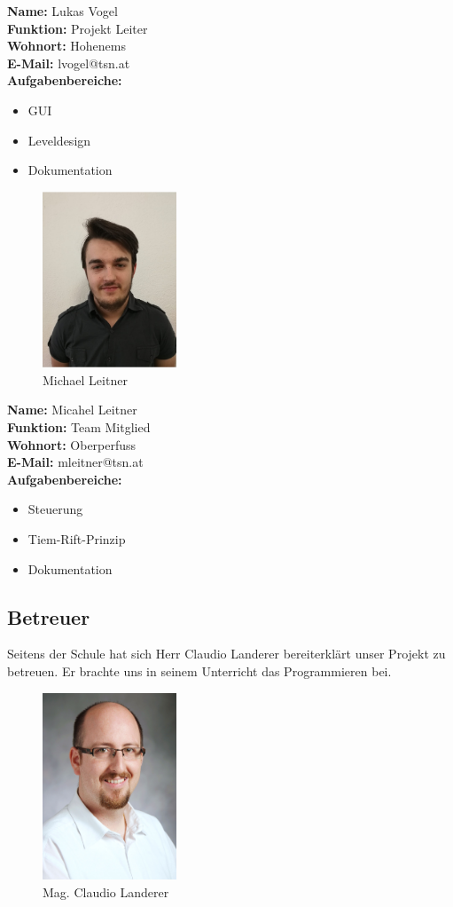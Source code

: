 	\textbf{Name:} Lukas Vogel\\
\textbf{Funktion:} Projekt Leiter\\
\textbf{Wohnort:} Hohenems\\
\textbf{E-Mail:} lvogel@tsn.at\\
\textbf{Aufgabenbereiche:} \begin{itemize}
	\item GUI
	\item Leveldesign
	\item Dokumentation
\end{itemize}
\begin{figure}[H]
	\centering
	\includegraphics[width=4cm]{images/Michael.PNG}
	\caption{Michael Leitner}
\end{figure}
	\textbf{Name:} Micahel Leitner\\
\textbf{Funktion:} Team Mitglied\\
\textbf{Wohnort:} Oberperfuss\\
\textbf{E-Mail:} mleitner@tsn.at\\
\textbf{Aufgabenbereiche:} \begin{itemize}
	\item Steuerung
	\item Tiem-Rift-Prinzip
	\item Dokumentation
\end{itemize}
\newpage
\subsection{Betreuer}
Seitens der Schule hat sich Herr Claudio Landerer bereiterklärt unser Projekt zu betreuen. Er brachte uns in seinem Unterricht das Programmieren bei.
	\begin{figure}[H]
		\centering
		\includegraphics[width=4cm]{images/Landerer_Claudio.jpg}
		\caption{Mag. Claudio Landerer}
	\end{figure}
		
